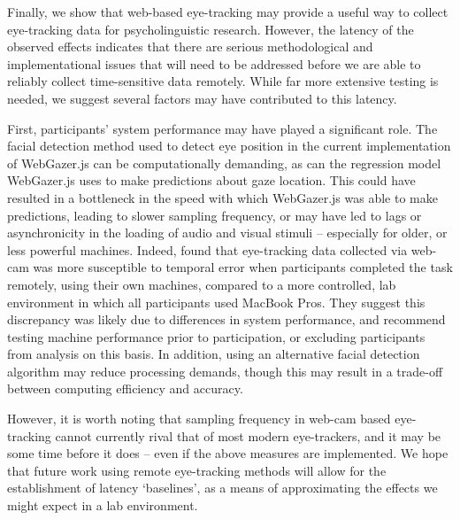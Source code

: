 \documentclass[10pt,letterpaper]{article}
\begin{document}
Finally, we show that web-based eye-tracking may provide a useful way to collect eye-tracking data for psycholinguistic research. However, the latency of the observed effects indicates that there are serious methodological and implementational issues that will need to be addressed before we are able to reliably collect time-sensitive data remotely. While far more extensive testing is needed, we suggest several factors may have contributed to this latency. 

First, participants' system performance may have played a significant role. The facial detection method used to detect eye position in the current implementation of WebGazer.js can be computationally demanding, as can the regression model WebGazer.js uses to make predictions about gaze location. This could have resulted in a bottleneck in the speed with which WebGazer.js was able to make predictions, leading to slower sampling frequency, or may have led to lags or asynchronicity in the loading of audio and visual stimuli -- especially for older, or less powerful machines. Indeed,  found that eye-tracking data collected via web-cam was more susceptible to temporal error when participants completed the task remotely, using their own machines, compared to a more controlled, lab environment in which all participants used MacBook Pros. They suggest this discrepancy was likely due to differences in system performance, and recommend testing machine performance prior to participation, or excluding participants from analysis on this basis. In addition, using an alternative facial detection algorithm may reduce processing demands, though this may result in a trade-off between computing efficiency and accuracy. 

However, it is worth noting that sampling frequency in web-cam based eye-tracking cannot currently rival that of most modern eye-trackers, and it may be some time before it does -- even if the above measures are implemented. We hope that future work using remote eye-tracking methods will allow for the establishment of latency `baselines', as a means of approximating the effects we might expect in a lab environment. %


\end{document}
